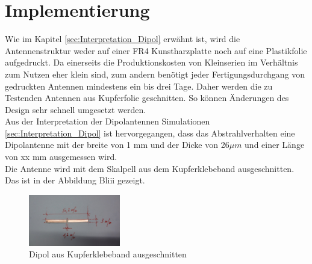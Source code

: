 \newpage 
\thispagestyle{empty}
\chapter{Implementierung}\label{sec:Implementierung}
Wie im Kapitel \ref{sec:Interpretation_Dipol} erwähnt ist, wird die Antennenstruktur weder auf einer FR4 Kunstharzplatte noch auf eine Plastikfolie aufgedruckt. Da einerseits die Produktionskosten von Kleinserien im Verhältnis zum Nutzen eher klein sind, zum andern benötigt jeder Fertigungsdurchgang von gedruckten Antennen  mindestens ein bis drei Tage. Daher werden die zu Testenden Antennen aus Kupferfolie geschnitten. So können Änderungen des Design sehr schnell umgesetzt werden.\\

Aus der Interpretation der Dipolantennen Simulationen \ref{sec:Interpretation_Dipol} ist hervorgegangen, dass das Abstrahlverhalten eine Dipolantenne mit der breite von 1 mm und der Dicke von 26$\mu m$ und einer Länge von xx mm ausgemessen wird.\\

Die Antenne wird mit dem Skalpell aus dem Kupferklebeband ausgeschnitten. Das ist in der Abbildung Bliii gezeigt.\\
\begin{figure}[!ht]
	\centering
	\includegraphics[width=4cm]{content/bilder/Implementierung/Dipol3mm50mm.jpg}%
	\caption{Dipol aus Kupferklebeband ausgeschnitten}
	\label{fig:DipolausKupferband}
\end{figure}



